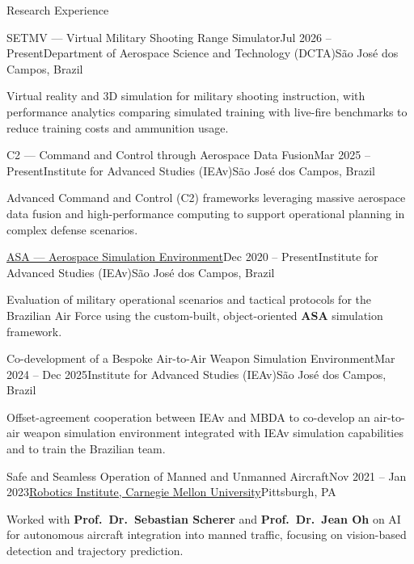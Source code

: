 \documentclass{resume} %
\begin{document}
\begin{rSection}{Research Experience}

\begin{rSubsection}{SETMV --- Virtual Military Shooting Range Simulator}{Jul 2026 -- Present}{Department of Aerospace Science and Technology (DCTA)}{São José dos Campos, Brazil}
\item Virtual reality and 3D simulation for military shooting instruction, with performance analytics comparing simulated training with live-fire benchmarks to reduce training costs and ammunition usage.
\end{rSubsection}

\begin{rSubsection}{C2 --- Command and Control through Aerospace Data Fusion}{Mar 2025 -- Present}{Institute for Advanced Studies (IEAv)}{São José dos Campos, Brazil}
\item Advanced Command and Control (C2) frameworks leveraging massive aerospace data fusion and high-performance computing to support operational planning in complex defense scenarios.
\end{rSubsection}

\begin{rSubsection}{\href{http://www.asa.dcta.mil.br/}{ASA --- Aerospace Simulation Environment}}{Dec 2020 -- Present}{Institute for Advanced Studies (IEAv)}{São José dos Campos, Brazil}
\item Evaluation of military operational scenarios and tactical protocols for the Brazilian Air Force using the custom-built, object-oriented \textbf{ASA} simulation framework.
\end{rSubsection}

\begin{rSubsection}{Co-development of a Bespoke Air-to-Air Weapon Simulation Environment}{Mar 2024 -- Dec 2025}{Institute for Advanced Studies (IEAv)}{São José dos Campos, Brazil}
\item Offset-agreement cooperation between IEAv and MBDA to co-develop an air-to-air weapon simulation environment integrated with IEAv simulation capabilities and to train the Brazilian team.
\end{rSubsection}

\begin{rSubsection}{Safe and Seamless Operation of Manned and Unmanned Aircraft}{Nov 2021 -- Jan 2023}{\href{https://www.ri.cmu.edu/}{Robotics Institute, Carnegie Mellon University}}{Pittsburgh, PA}
\item Worked with \textbf{Prof.~Dr.~Sebastian Scherer} and \textbf{Prof.~Dr.~Jean Oh} on AI for autonomous aircraft integration into manned traffic, focusing on vision-based detection and trajectory prediction.
\end{rSubsection}


\end{rSection}
\end{document}
